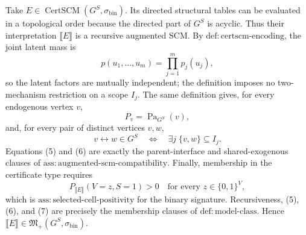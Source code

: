 Take \(E\in\operatorname{CertSCM}(G^S,\sigma_{\mathrm{bin}})\).  Its directed structural tables can be evaluated in a topological order because the directed part of \(G^S\) is acyclic.  Thus their interpretation \(\llbracket E\rrbracket\) is a recursive augmented SCM.  By \(\mathrm{def:certscm\text{-}encoding}\), the joint latent mass is
\[
  p(u_1,\ldots,u_m)=\prod_{j=1}^m p_j(u_j),
\]
so the latent factors are mutually independent; the definition imposes no two-mechanism restriction on a scope \(I_j\).  The same definition gives, for every endogenous vertex \(v\),
\[
  P_v=\operatorname{Pa}_{G^S}(v), \tag{5}
\]
and, for every pair of distinct vertices \(v,w\),
\[
 v\leftrightarrow w\in G^S
 \quad\Longleftrightarrow\quad
 \exists j\;\{v,w\}\subseteq I_j. \tag{6}
\]
Equations (5) and (6) are exactly the parent-interface and shared-exogenous clauses of \(\mathrm{ass:augmented\text{-}scm\text{-}compatibility}\).  Finally, membership in the certificate type requires
\[
 P_{\llbracket E\rrbracket}(V=z,S=1)>0
 \quad\text{for every }z\in\{0,1\}^{V}, \tag{7}
\]
which is \(\mathrm{ass:selected\text{-}cell\text{-}positivity}\) for the binary signature.  Recursiveness, (5), (6), and (7) are precisely the membership clauses of \(\mathrm{def:model\text{-}class}\).  Hence \(\llbracket E\rrbracket\in\mathfrak M_+(G^S,\sigma_{\mathrm{bin}})\).